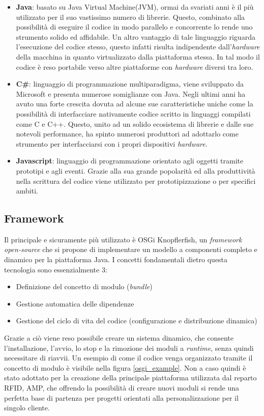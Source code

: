 \begin{itemize}
    \item \textbf{Java}: basato su Java Virtual Machine(JVM), ormai da svariati anni è il più utilizzato per il suo vastissimo numero di librerie. Questo,
    combinato alla possibilità di eseguire il codice in modo parallelo e concorrente
    lo rende uno strumento solido ed affidabile. Un altro vantaggio di tale linguaggio riguarda l'esecuzione del codice stesso, questo infatti risulta indipendente dall’\emph{hardware} della macchina in quanto virtualizzato 
    dalla piattaforma stessa. In tal modo il codice è reso portabile verso altre piattaforme con \emph{hardware} diversi tra loro.
    \item \textbf{C\#}: linguaggio di programmazione multiparadigma, viene sviluppato da Microsoft e presenta numerose somiglianze con Java. Negli ultimi anni ha avuto una forte crescita dovuta ad alcune sue caratteristiche uniche
    come la possibilità di interfacciare nativamente codice scritto in linguaggi compilati come C e C++. Questo, unito ad un solido ecosistema di librerie e dalle sue notevoli performance, ha spinto numerosi produttori ad 
    adottarlo come strumento per interfacciarsi con i propri dispositivi \emph{hardware}.
    \item \textbf{Javascript}: linguaggio di programmazione orientato agli oggetti tramite prototipi e agli eventi. Grazie alla sua grande popolarità ed alla
    produttività nella scrittura del codice viene utilizzato per prototipizzazione o per specifici ambiti.
\end{itemize}

\subsection{Framework}

Il principale e sicuramente più utilizzato è OSGi Knopflerfish, un \emph{framework open-source} che si propone di implementare 
un modello a componenti completo e dinamico per la piattaforma Java. I concetti fondamentali dietro questa tecnologia sono essenzialmente 3:
\begin{itemize}
    \item Definizione del concetto di modulo (\emph{bundle})
    \item Gestione automatica delle dipendenze
    \item Gestione del ciclo di vita del codice (configurazione e distribuzione dinamica)
\end{itemize}
Grazie a ciò viene reso possibile creare un sistema dinamico, che consente l'installazione, l'avvio, lo stop e la rimozione dei moduli a \emph{runtime}, 
senza quindi necessitare di riavvii. Un esempio di come il codice venga organizzato tramite il concetto di modulo è visibile nella figura \ref{osgi_example}. 
Non a caso quindi è stato adottato per la creazione della principale piattaforma utilizzata dal reparto RFID, AMP, 
che offrendo la possibilità di creare nuovi moduli si rende una perfetta base di partenza per progetti orientati alla personalizzazione per il singolo cliente.

